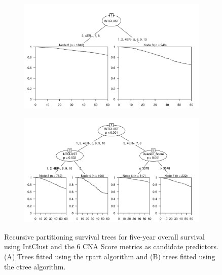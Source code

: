 \begin{figure}[!htb]
\centering

\vspace{0.5cm}

\begin{subfigure}{\textwidth}
\subcaption{}
\includegraphics[width=1\textwidth]{../figures/Appendices/Appendix_B/PartyKit_Survival_Score_FiveYearOS_INTCLUST.png}
\end{subfigure}

\vspace{2cm}

\begin{subfigure}{\textwidth}
\subcaption{}
\includegraphics[width=1\textwidth]{../figures/Appendices/Appendix_B/Ctree_Survival_Score_FiveYearOS_INTCLUST.png}
\end{subfigure}

\vspace{0.5cm}

\caption[Recursive partitioning survival trees for five-year overall survival using IntClust and the 6 CNA Score metrics as candidate predictors.]{Recursive partitioning survival trees for five-year overall survival using IntClust and the 6 CNA Score metrics as candidate predictors. (A) Trees fitted using the rpart algorithm and (B) trees fitted using the ctree algorithm.}
\end{figure}

